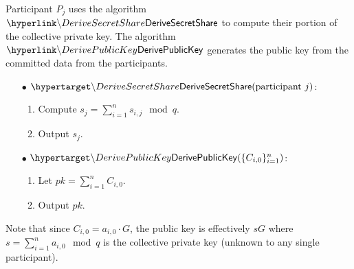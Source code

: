 \begin{mdframed}
Participant $P_j$ uses the algorithm $\hlget{\DeriveSecretShare}$ to compute their portion of the collective private key. The algorithm $\hlget{\DerivePublicKey}$ generates the public key from the committed data from the participants. \\

\noindent 
\begin{minipage}[t]{0.5\textwidth}
	\begin{itemize}
		\item[$\bullet$] $\hlset{\DeriveSecretShare}(\text{participant $j$})$:  \vspace{0.1cm}
		\begin{enumerate}
			\item Compute $s_j = \sum_{i = 1}^{n} s_{i, j} \mod q$.
			\item Output $s_j$.
		\end{enumerate}
	\end{itemize}
\end{minipage}
%
\begin{minipage}[t]{0.5\textwidth}
	\begin{itemize}
	\item[$\bullet$] $\hlset{\DerivePublicKey}(\{C_{i,0}\}_{i=1}^n)$:  \vspace{0.1cm}
	\begin{enumerate}
		\item Let $pk = \sum_{i=1}^n C_{i,0}$.
		\item Output $pk$.
	\end{enumerate}
	\end{itemize}
	Note that since $C_{i,0} = a_{i,0} \cdot G$, the public key is effectively $sG$ where $s = \sum_{i = 1}^n a_{i,0} \mod q$ is the collective private key (unknown to any single participant).
\end{minipage}
%
\end{mdframed}
